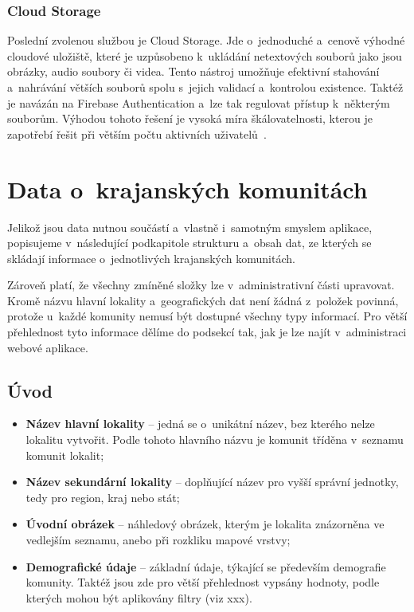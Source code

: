 \hypertarget{cloud-storage}{%
\subsubsection{Cloud Storage}\label{cloud-storage}}

Poslední zvolenou službou je Cloud Storage. Jde o~jednoduché a~cenově výhodné cloudové uložiště, které je uzpůsobeno k~ukládání netextových souborů jako jsou obrázky, audio soubory či videa. Tento nástroj umožňuje efektivní stahování a~nahrávání větších souborů spolu s~jejich validací a~kontrolou existence. Taktéž je navázán na Firebase Authentication a~lze tak regulovat přístup k~některým souborům. Výhodou tohoto řešení je vysoká míra škálovatelnosti, kterou je zapotřebí řešit při větším počtu aktivních uživatelů~\parencite{storage}.

\hypertarget{data-o-krajanskuxfdch-komunituxe1ch}{%
\section{Data o~krajanských komunitách}\label{data-o-krajanskuxfdch-komunituxe1ch}}

Jelikož jsou data nutnou součástí a~vlastně i~samotným smyslem aplikace, popisujeme v~následující podkapitole strukturu a~obsah dat, ze kterých se skládají informace o~jednotlivých krajanských komunitách.

Zároveň platí, že všechny zmíněné složky lze v~administrativní části upravovat. Kromě názvu hlavní lokality a~geografických dat není žádná z~položek povinná, protože u~každé komunity nemusí být dostupné všechny typy informací. Pro větší přehlednost tyto informace dělíme do podsekcí tak, jak je lze najít v~administraci webové aplikace.

\hypertarget{uxfavod}{%
\subsection{Úvod}\label{uxfavod}}

\begin{itemize}
\tightlist
\item
  \textbf{Název hlavní lokality} -- jedná se o~unikátní název, bez kterého nelze lokalitu vytvořit. Podle tohoto hlavního názvu je komunit tříděna v~seznamu komunit lokalit;
\item
  \textbf{Název sekundární lokality } -- doplňující název pro vyšší správní jednotky, tedy pro region, kraj nebo stát;
\item
  \textbf{Úvodní obrázek} -- náhledový obrázek, kterým je lokalita znázorněna ve vedlejším seznamu, anebo při rozkliku mapové vrstvy;
\item
  \textbf{Demografické údaje} -- základní údaje, týkající se především demografie komunity. Taktéž jsou zde pro větší přehlednost vypsány hodnoty, podle kterých mohou být aplikovány filtry (viz xxx).
\end{itemize}

